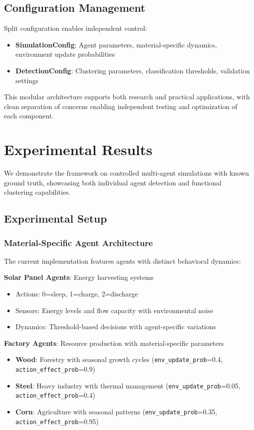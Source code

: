 \documentclass[10pt,conference]{IEEEtran}
\begin{document}
\subsection{Configuration Management}
Split configuration enables independent control:
\begin{itemize}
  \item \textbf{SimulationConfig}: Agent parameters, material-specific dynamics, environment update probabilities
  \item \textbf{DetectionConfig}: Clustering parameters, classification thresholds, validation settings
\end{itemize}

This modular architecture supports both research and practical applications, with clean separation of concerns enabling independent testing and optimization of each component.

\section{Experimental Results}
We demonstrate the framework on controlled multi-agent simulations with known ground truth, showcasing both individual agent detection and functional clustering capabilities.

\subsection{Experimental Setup}

\subsubsection{Material-Specific Agent Architecture}
The current implementation features agents with distinct behavioral dynamics:

\textbf{Solar Panel Agents}: Energy harvesting systems
\begin{itemize}
  \item Actions: 0=sleep, 1=charge, 2=discharge
  \item Sensors: Energy levels and flow capacity with environmental noise
  \item Dynamics: Threshold-based decisions with agent-specific variations
\end{itemize}

\textbf{Factory Agents}: Resource production with material-specific parameters
\begin{itemize}
  \item \textbf{Wood}: Forestry with seasonal growth cycles (\texttt{env\_update\_prob}=0.4, \texttt{action\_effect\_prob}=0.9)
  \item \textbf{Steel}: Heavy industry with thermal management (\texttt{env\_update\_prob}=0.05, \texttt{action\_effect\_prob}=0.4)
  \item \textbf{Corn}: Agriculture with seasonal patterns (\texttt{env\_update\_prob}=0.35, \texttt{action\_effect\_prob}=0.95)
\end{itemize}
\end{document}
